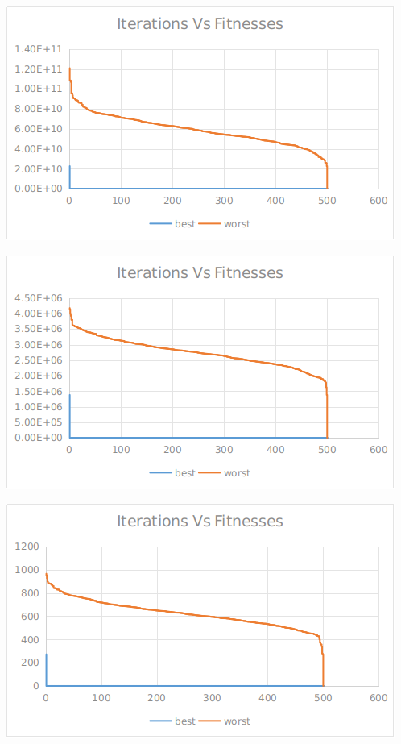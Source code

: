 \documentclass[12pt]{article}
\begin{document}
					\begin{minipage}{0.6\linewidth}
						\includegraphics[width=\linewidth]{39.png}
					\end{minipage}
					\hfill
					\begin{minipage}{0.6\linewidth}
						\includegraphics[width=\linewidth]{40.png}
					\end{minipage}
					\begin{minipage}{0.6\linewidth}
						\includegraphics[width=\linewidth]{41.png}
					\end{minipage}
\end{document}
